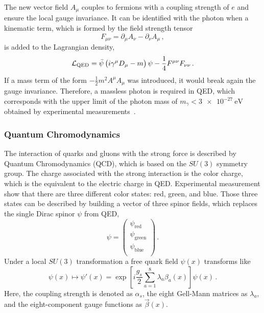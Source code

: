 The new vector field $A_\mu$ couples to fermions with a coupling strength of $e$ and ensure the local gauge invariance.
It can be identified with the photon when a kinematic term, which is formed by the field strength tensor
\begin{equation}
    F_{\mu \nu} = \partial_\mu A_\nu - \partial_\nu A_\mu \,,
\end{equation}
is added to the Lagrangian density,
\begin{equation}
    \mathcal{L}_\text{QED} = \bar{\psi} \left( i \gamma^\mu D_\mu -m \right) \psi - \frac{1}{4} F^{\mu\nu} F_{\nu\nu} \,.
\end{equation}
If a mass term of the form $-\frac{1}{2}m^2 A^\mu A_\mu $ was introduced, it would break again the gauge invariance.
Therefore, a massless photon is required in QED, which corresponds with the upper limit of the photon mass of $m_\gamma < \SI{3e-27}{\eV}$
obtained by experimental measurements~\cite{PhotonMass}.

\subsubsection{Quantum Chromodynamics}

The interaction of quarks and gluons with the strong force is described by Quantum Chromodynamics (QCD), which is based on the $SU(3)$ symmetry group.
The charge associated with the strong interaction is the color charge, which is the equivalent to the electric charge in QED\@.
Experimental measurement show that there are three different color states: red, green, and blue.
Those three states can be described by building a vector of three spinor fields, which replaces the single Dirac spinor $\psi$ from QED,
\begin{equation}
    \psi =
    \begin{pmatrix}
        \psi_\text{red} \\
        \psi_\text{green} \\
        \psi_\text{blue} \\
    \end{pmatrix} \,.
\end{equation}
Under a local $SU(3)$ transformation a free quark field $\psi(x)$ transforms like
\begin{equation}
    \psi(x) \mapsto \psi'(x) = \exp \left[ i \frac{g_s}{2} \sum_{a=1}^8 \lambda_a \beta_a (x) \right] \psi(x) \,.
\end{equation}
Here, the coupling strength is denoted as $\alpha_s$, the eight Gell-Mann matrices as $\lambda_a$, and the eight-component gauge functions as $\vec{\beta}(x)$. %

